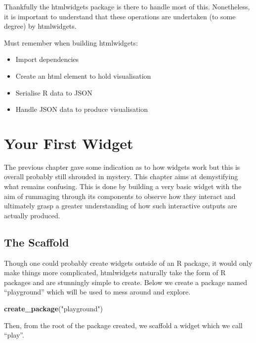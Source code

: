 \documentclass[
]{krantz}
\makeatletter
\newenvironment{Shaded}{\begin{snugshade}}{\end{snugshade}}
\newcommand{\KeywordTok}[1]{\textcolor[rgb]{0.27,0.27,0.27}{\textbf{#1}}}
\newcommand{\NormalTok}[1]{#1}
\newcommand{\StringTok}[1]{\textcolor[rgb]{0.5,0.5,0.5}{#1}}
\providecommand{\tightlist}{%
  \setlength{\itemsep}{0pt}\setlength{\parskip}{0pt}}
\newenvironment{kframe}{%
\medskip{}
\setlength{\fboxsep}{.8em}
 \def\at@end@of@kframe{}%
 \ifinner\ifhmode%
  \def\at@end@of@kframe{\end{minipage}}%
  \begin{minipage}{\columnwidth}%
 \fi\fi%
 \def\FrameCommand##1{\hskip\@totalleftmargin \hskip-\fboxsep
 \colorbox{shadecolor}{##1}\hskip-\fboxsep
     \hskip-\linewidth \hskip-\@totalleftmargin \hskip\columnwidth}%
 \MakeFramed {\advance\hsize-\width
   \@totalleftmargin\z@ \linewidth\hsize
   \@setminipage}}%
 {\par\unskip\endMakeFramed%
 \at@end@of@kframe}
\renewenvironment{Shaded}{\begin{kframe}}{\end{kframe}}
\makeatother
\begin{document}
Thankfully the htmlwidgets package is there to handle most of this. Nonetheless, it is important to understand that these operations are undertaken (to some degree) by htmlwidgets.

Must remember when building htmlwidgets:

\begin{itemize}
\tightlist
\item
  Import dependencies
\item
  Create an html element to hold visualisation
\item
  Serialise R data to JSON
\item
  Handle JSON data to produce visualisation
\end{itemize}

\hypertarget{your-first-widget}{%
\chapter{Your First Widget}\label{your-first-widget}}

The previous chapter gave some indication as to how widgets work but this is overall probably still shrouded in mystery. This chapter aims at demystifying what remains confusing. This is done by building a very basic widget with the aim of rummaging through its components to observe how they interact and ultimately grasp a greater understanding of how such interactive outputs are actually produced.

\hypertarget{the-scaffold}{%
\section{The Scaffold}\label{the-scaffold}}

Though one could probably create widgets outside of an R package, it would only make things more complicated, htmlwidgets naturally take the form of R packages and are stunningly simple to create. Below we create a package named ``playground'' which will be used to mess around and explore.

\begin{Shaded}
\begin{Highlighting}[]
\KeywordTok{create\_package}\NormalTok{(}\StringTok{"playground"}\NormalTok{)}
\end{Highlighting}
\end{Shaded}

Then, from the root of the package created, we scaffold a widget which we call ``play''.
\end{document}
